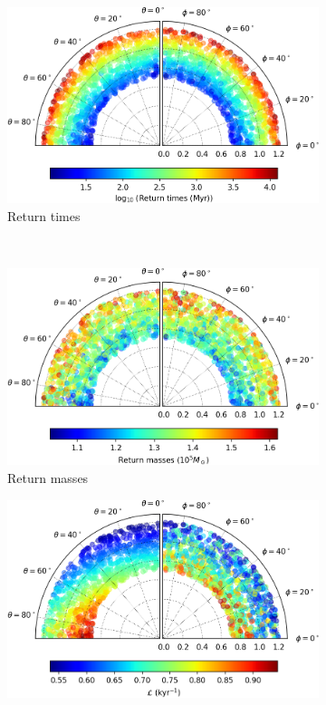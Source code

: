 \begin{figure}[h]
    \centering
    \begin{subfigure}[t]{0.4\textwidth}
        \includegraphics[width = \textwidth]{"../Files/Week 13/images/20_time"}
        \caption{Return times}
    \end{subfigure}
    ~ 
    \begin{subfigure}[t]{0.4\textwidth}
        \includegraphics[width=\textwidth]{"../Files/Week 13/images/20_mass"}
        \caption{Return masses}
    \end{subfigure}
    \begin{subfigure}[t]{0.4\textwidth}
        \includegraphics[width=\textwidth]{"../Files/Week 13/images/20_lyapunov"}

\end{subfigure}
\end{figure}
